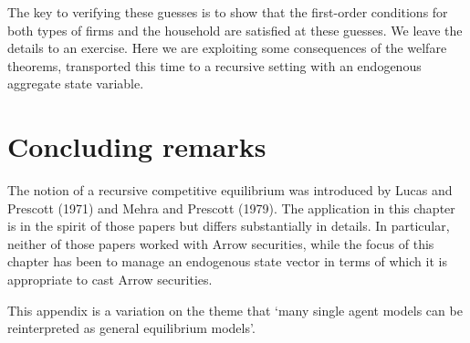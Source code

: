  The key to verifying these guesses is to show that the first-order
conditions for both types of firms and the household are
satisfied at these guesses.  We leave the details to an exercise.
Here we are exploiting some consequences of the welfare
theorems, transported this time to a recursive setting with an
endogenous aggregate state variable.


\section{Concluding remarks}
  The notion of a recursive competitive equilibrium was introduced
by Lucas and Prescott (1971) and Mehra and Prescott (1979).
The application in this chapter is in the spirit of those papers
but differs substantially in details.  In particular, neither of
those papers worked with Arrow securities, while the focus of this
chapter has been to manage an endogenous state vector in terms of
which it is appropriate to cast Arrow securities.

%
%
%


%

\label{sec:perm_income_ge}%
This appendix is a variation on the theme that `many single agent models can
be reinterpreted as general equilibrium models'.
